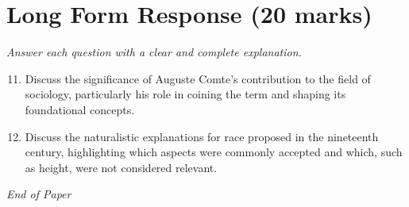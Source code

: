 \documentclass[12pt]{article}
\begin{document}
\section*{Long Form Response (20 marks)}
\textit{Answer each question with a clear and complete explanation.}
\begin{enumerate}[label=\arabic*.]
\setcounter{enumi}{10}
\item Discuss the significance of Auguste Comte's contribution to the field of sociology, particularly his role in coining the term and shaping its foundational concepts.
\item Discuss the naturalistic explanations for race proposed in the nineteenth century, highlighting which aspects were commonly accepted and which, such as height, were not considered relevant.
\end{enumerate}

\vfill
\noindent\textit{End of Paper}
\end{document}
